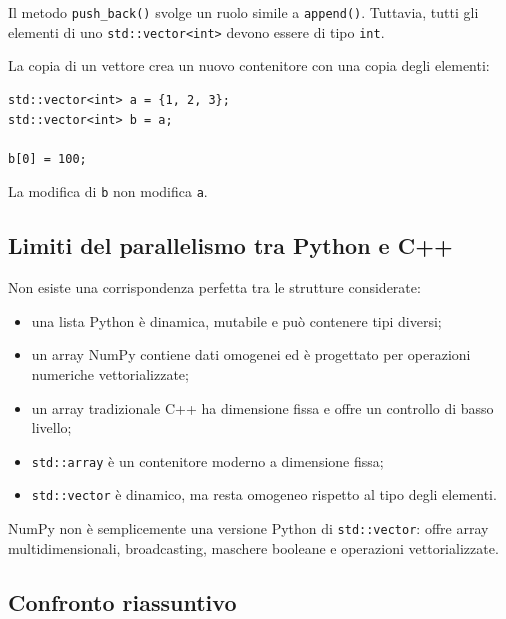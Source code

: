 \documentclass[11pt,a4paper]{book}
\begin{document}
Il metodo \texttt{push\_back()} svolge un ruolo simile a \texttt{append()}. Tuttavia, tutti gli elementi di uno \texttt{std::vector<int>} devono essere di tipo \texttt{int}.

La copia di un vettore crea un nuovo contenitore con una copia degli elementi:

\begin{lstlisting}[style=c++]
std::vector<int> a = {1, 2, 3};
std::vector<int> b = a;

b[0] = 100;
\end{lstlisting}

La modifica di \texttt{b} non modifica \texttt{a}.

\subsection{Limiti del parallelismo tra Python e C++}

Non esiste una corrispondenza perfetta tra le strutture considerate:

\begin{itemize}
    \item una lista Python è dinamica, mutabile e può contenere tipi diversi;
    \item un array NumPy contiene dati omogenei ed è progettato per operazioni numeriche vettorializzate;
    \item un array tradizionale C++ ha dimensione fissa e offre un controllo di basso livello;
    \item \texttt{std::array} è un contenitore moderno a dimensione fissa;
    \item \texttt{std::vector} è dinamico, ma resta omogeneo rispetto al tipo degli elementi.
\end{itemize}

NumPy non è semplicemente una versione Python di \texttt{std::vector}: offre array multidimensionali, broadcasting, maschere booleane e operazioni vettorializzate.

\subsection{Confronto riassuntivo}
\end{document}
